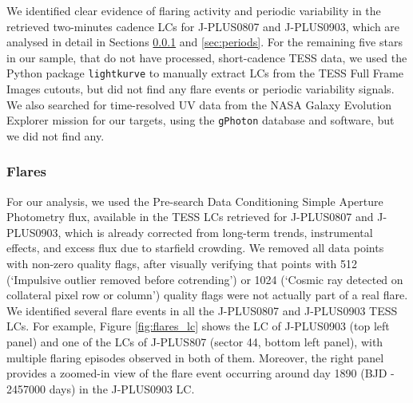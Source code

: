 We identified clear evidence of flaring activity and periodic variability in the retrieved two-minutes cadence LCs for J-PLUS0807 and J-PLUS0903, which are analysed in detail in Sections \ref{sec:flares} and \ref{sec:periods}. For the remaining five stars in our sample, that do not have processed, short-cadence TESS data, we used the Python package \texttt{lightkurve} \citep{lightkurve} to manually extract LCs from the TESS Full Frame Images cutouts, but did not find any flare events or periodic variability signals. We also searched for time-resolved UV data from the NASA Galaxy Evolution Explorer \citep[GALEX;][]{galex} mission for our targets, using the \texttt{gPhoton} \citep{gphoton} database and software, but we did not find any.




\subsubsection{Flares}
\label{sec:flares}


For our analysis, we used the Pre-search Data Conditioning Simple Aperture Photometry \citep[PDCSAP;][]{smith2012,stumpe2012,stumpe2014} flux, available in the TESS LCs retrieved for J-PLUS0807 and J-PLUS0903, which is already corrected from long-term trends, instrumental effects, and excess flux due to starfield crowding. We removed all data points with non-zero quality flags, after visually verifying that points with 512 (`Impulsive outlier removed before cotrending') or 1024 (`Cosmic ray detected on collateral pixel row or column') quality flags were not actually part of a real flare. We identified several flare events in all the J-PLUS0807 and J-PLUS0903 TESS LCs. For example, Figure \ref{fig:flares_lc} shows the LC of J-PLUS0903 (top left panel) and one of the LCs of J-PLUS807 (sector 44, bottom left panel), with multiple flaring episodes observed in both of them. Moreover, the right panel provides a zoomed-in view of the flare event occurring around day 1890 (BJD - 2457000 days) in the J-PLUS0903 LC.



